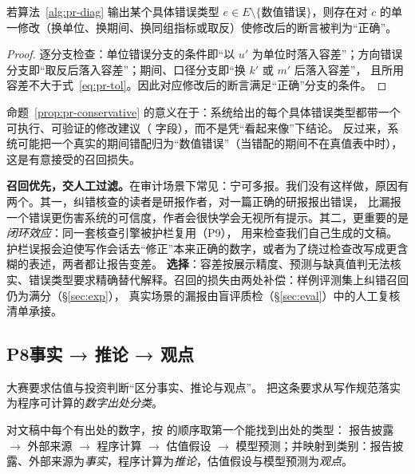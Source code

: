 \begin{proposition}[诊断的保守性]\label{prop:pr-conservative}
若算法~\ref{alg:pr-diag} 输出某个具体错误类型 $e\in E\setminus\{\text{数值错误}\}$，则存在对 $c$ 的单一修改（换单位、换期间、换同组指标或取反）使修改后的断言被判为“正确”。
\end{proposition}
\begin{proof}
逐分支检查：单位错误分支的条件即“以 $u'$ 为单位时落入容差”；方向错误分支即“取反后落入容差”；期间、口径分支即“换 $k'$ 或 $m'$ 后落入容差”，
且所用容差不大于式~\eqref{eq:pr-tol}。因此对应修改后的断言满足“正确”分支的条件。
\end{proof}

命题~\ref{prop:pr-conservative} 的意义在于：系统给出的每个具体错误类型都带一个可执行、可验证的修改建议（ 字段），而不是凭“看起来像”下结论。
反过来，系统可能把一个真实的期间错配归为“数值错误”（当错配的期间不在真值表中时），这是有意接受的召回损失。

\begin{tradeoff}[：召回优先还是误报优先]
\textbf{召回优先，交人工过滤。}在审计场景下常见：宁可多报。我们没有这样做，原因有两个。其一，纠错核查的读者是研报作者，对一篇正确的研报报出错误，
比漏报一个错误更伤害系统的可信度，作者会很快学会无视所有提示。其二，更重要的是\emph{闭环效应}：同一套核查引擎被护栏复用（P9），
用来检查我们自己生成的文稿。护栏误报会迫使写作会话去“修正”本来正确的数字，或者为了绕过检查改写成更含糊的表述，两者都让报告变差。
\textbf{选择}：容差按展示精度、预测与缺真值判无法核实、错误类型要求精确替代解释。召回的损失由两处补偿：样例评测集上纠错召回仍为满分（\S\ref{sec:exp}），
真实场景的漏报由盲评质检（\S\ref{sec:eval}）中的人工复核清单承接。
\end{tradeoff}

\subsection{P8\quad 事实 → 推论 → 观点}
\label{sec:pr-p8}

大赛要求估值与投资判断“区分事实、推论与观点”。\sysname{} 把这条要求从写作规范落实为程序可计算的\emph{数字出处分类}。

\begin{definition}[出处类型与认识论类别]\label{def:pr-evidence}
对文稿中每个有出处的数字，按  的顺序取第一个能找到出处的类型：
报告披露 $\to$ 外部来源 $\to$ 程序计算 $\to$ 估值假设 $\to$ 模型预测；并映射到类别：报告披露、外部来源为\emph{事实}，程序计算为\emph{推论}，估值假设与模型预测为\emph{观点}。
\end{definition}

